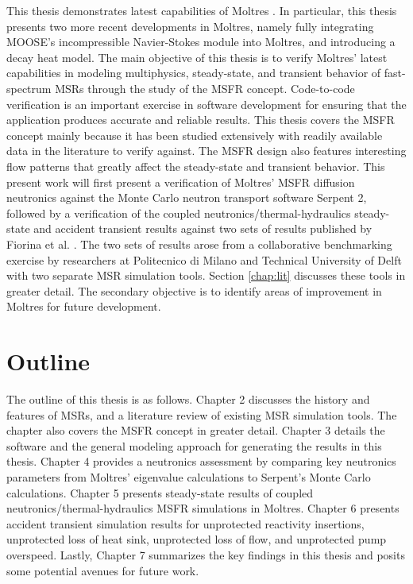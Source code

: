 This thesis demonstrates latest capabilities of Moltres
\cite{lindsay_introduction_2018}.
In particular, this thesis presents two more recent
developments in Moltres, namely fully integrating \gls{MOOSE}'s incompressible
Navier-Stokes module into Moltres, and introducing a
decay heat model.
The main objective of this thesis is to verify Moltres'
latest capabilities in modeling multiphysics, steady-state, and transient
behavior of fast-spectrum \glspl{MSR} through the study of the \gls{MSFR}
concept. Code-to-code verification is an important exercise in software
development for ensuring that the application produces accurate and reliable
results. This thesis covers the \gls{MSFR} concept mainly because it has been
studied extensively with readily available data in the literature to verify
against. The \gls{MSFR} design also features interesting flow
patterns that greatly affect the steady-state and transient behavior. This
present work will first present a verification of Moltres' \gls{MSFR}
diffusion neutronics against the Monte Carlo neutron transport software
Serpent 2, followed by a verification of
the coupled neutronics/thermal-hydraulics steady-state and accident transient
results against two sets of results published by
Fiorina et al. \cite{fiorina_modelling_2014}. The two sets of results arose
from a collaborative benchmarking exercise by researchers at Politecnico di
Milano and Technical University of Delft with two separate \gls{MSR}
simulation tools. Section \ref{chap:lit} discusses these tools
in greater detail. The
secondary objective is to identify areas of improvement in Moltres for future
development.

\section{Outline}

The outline of this thesis is as follows. Chapter 2 discusses the history and
features of \glspl{MSR}, and a literature review of existing \gls{MSR}
simulation tools. The chapter also covers the \gls{MSFR} concept in greater
detail. Chapter 3 details the software and the general modeling
approach for generating the results in this thesis. Chapter 4 provides a
neutronics assessment by comparing key neutronics parameters from Moltres'
eigenvalue calculations to Serpent's Monte Carlo calculations. Chapter 5
presents steady-state results of coupled neutronics/thermal-hydraulics
\gls{MSFR} simulations in Moltres. Chapter 6 presents accident transient
simulation results for unprotected reactivity insertions, unprotected loss of
heat sink, unprotected loss of flow, and unprotected pump overspeed. Lastly,
Chapter 7 summarizes the key findings in this thesis
and posits some potential avenues for future work.
